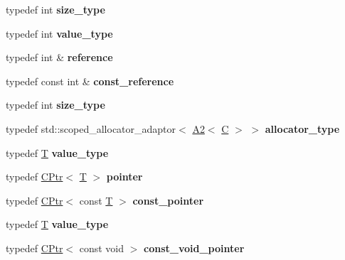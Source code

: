 \begin{DoxyCompactItemize}
typedef int {\bfseries size\+\_\+type}
\item 
\mbox{\label{struct_c_a98485d7f6d9c8bc92172e91ae51b7ce1}} 
typedef int {\bfseries value\+\_\+type}
\item 
\mbox{\label{struct_c_a70a956d99a00871ae514d4db285f6b7d}} 
typedef int \& {\bfseries reference}
\item 
\mbox{\label{struct_c_ac6de935c84e1cec90fc75c87bbec0d1e}} 
typedef const int \& {\bfseries const\+\_\+reference}
\item 
\mbox{\label{struct_c_a0d79b349d947d25a3e91b7b9fb1353f2}} 
typedef int {\bfseries size\+\_\+type}
\item 
\mbox{\label{struct_c_a031bb9f73d9dbc893e011323ee1ef51f}} 
typedef std\+::scoped\+\_\+allocator\+\_\+adaptor$<$ \mbox{\hyperlink{struct_a2}{A2}}$<$ \mbox{\hyperlink{struct_c}{C}} $>$ $>$ {\bfseries allocator\+\_\+type}
\item 
\mbox{\label{struct_c_a096a21f71a76fee4bf3931999b507b9e}} 
typedef \mbox{\hyperlink{struct_t}{T}} {\bfseries value\+\_\+type}
\item 
\mbox{\label{struct_c_a7ced4e5ff17a6f4ba88295aae5186fea}} 
typedef \mbox{\hyperlink{struct_c_ptr}{C\+Ptr}}$<$ \mbox{\hyperlink{struct_t}{T}} $>$ {\bfseries pointer}
\item 
\mbox{\label{struct_c_a1e1c5c3ca3c84428209adc46ba4840e9}} 
typedef \mbox{\hyperlink{struct_c_ptr}{C\+Ptr}}$<$ const \mbox{\hyperlink{struct_t}{T}} $>$ {\bfseries const\+\_\+pointer}
\item 
\mbox{\label{struct_c_a096a21f71a76fee4bf3931999b507b9e}} 
typedef \mbox{\hyperlink{struct_t}{T}} {\bfseries value\+\_\+type}
\item 
\mbox{\label{struct_c_a9f87a202b0baf1175a1970d32fd68e4e}} 
typedef \mbox{\hyperlink{struct_c_ptr}{C\+Ptr}}$<$ const void $>$ {\bfseries const\+\_\+void\+\_\+pointer}
\item 
\mbox{\label{struct_c_a096a21f71a76fee4bf3931999b507b9e}} 

\end{DoxyCompactItemize}
